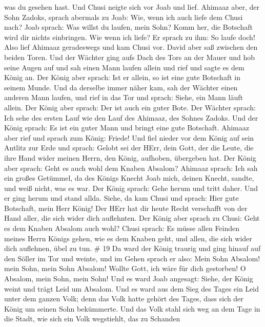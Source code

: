 was du gesehen hast. Und Chusi neigte sich vor Joab und lief.
 Ahimaaz aber, der Sohn Zadoks, sprach abermals zu Joab:
Wie, wenn ich auch liefe dem Chusi nach? Joab sprach: Was willst du
laufen, mein Sohn? Komm her, die Botschaft wird dir nichts einbringen.
 Wie wenn ich liefe? Er sprach zu ihm: So laufe doch! Also
lief Ahimaaz geradeswegs und kam Chusi vor.  David aber saß
zwischen den beiden Toren. Und der Wächter ging aufs Dach des Tors an
der Mauer und hob seine Augen auf und sah einen Mann laufen allein
 und rief und sagte es dem König an. Der König aber sprach:
Ist er allein, so ist eine gute Botschaft in seinem Munde. Und da
derselbe immer näher kam,  sah der Wächter einen anderen
Mann laufen, und rief in das Tor und sprach: Siehe, ein Mann läuft
allein. Der König aber sprach: Der ist auch ein guter Bote.
 Der Wächter sprach: Ich sehe des ersten Lauf wie den Lauf
des Ahimaaz, des Sohnes Zadoks. Und der König sprach: Es ist ein guter
Mann und bringt eine gute Botschaft.  Ahimaaz aber rief und
sprach zum König: Friede! Und fiel nieder vor dem König auf sein Antlitz
zur Erde und sprach: Gelobt sei der HErr, dein Gott, der die Leute, die
ihre Hand wider meinen Herrn, den König, aufhoben, übergeben hat.
 Der König aber sprach: Geht es auch wohl dem Knaben
Absalom? Ahimaaz sprach: Ich sah ein großes Getümmel, da des Königs
Knecht Joab mich, deinen Knecht, sandte, und weiß nicht, was es war.
 Der König sprach: Gehe herum und tritt daher. Und er ging
herum und stand allda.  Siehe, da kam Chusi und sprach:
Hier gute Botschaft, mein Herr König! Der HErr hat dir heute Recht
verschafft von der Hand aller, die sich wider dich auflehnten.
 Der König aber sprach zu Chusi: Geht es dem Knaben Absalom
auch wohl? Chusi sprach: Es müsse allen Feinden meines Herrn Königs
gehen, wie es dem Knaben geht, und allen, die sich wider dich auflehnen,
übel zu tun. \# 19  Da ward der König traurig und ging
hinauf auf den Söller im Tor und weinte, und im Gehen sprach er also:
Mein Sohn Absalom! mein Sohn, mein Sohn Absalom! Wollte Gott, ich wäre
für dich gestorben! O Absalom, mein Sohn, mein Sohn!  Und es
ward Joab angesagt: Siehe, der König weint und trägt Leid um Absalom.
 Und es ward aus dem Sieg des Tages ein Leid unter dem
ganzen Volk; denn das Volk hatte gehört des Tages, dass sich der König
um seinen Sohn bekümmerte.  Und das Volk stahl sich weg an
dem Tage in die Stadt, wie sich ein Volk wegstiehlt, das zu Schanden
